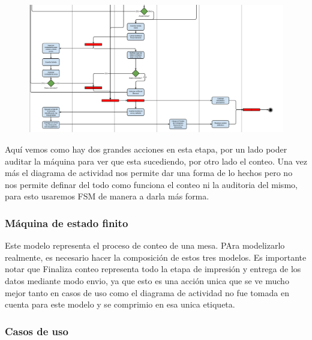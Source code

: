\begin{figure}[h!]
\centering
\includegraphics[scale=0.5]{imagenes/actividad/actividadConteo2}
\end{figure}

Aquí vemos como hay dos grandes acciones en esta etapa, por un lado poder auditar la máquina para ver que esta sucediendo, por otro lado el conteo. Una vez más el diagrama de actividad nos permite dar una forma de lo hechos pero no nos permite definar del todo como funciona el conteo ni la auditoria del mismo, para esto usaremos FSM de manera a darla más forma.

\subsubsection{Máquina de estado finito}

\begin{figure}[h!]
\centering
\end{figure}			

Este modelo representa el proceso de conteo de una mesa. PAra modelizarlo realmente, es necesario hacer la composición de estos tres modelos. Es importante notar que Finaliza conteo representa todo la etapa de impresión y entrega de los datos mediante modo envio, ya que esto es una acción unica que se ve mucho mejor tanto en casos de uso como el diagrama de actividad no fue tomada en cuenta para este modelo y se comprimio en esa unica etiqueta.

\subsubsection{Casos de uso}

